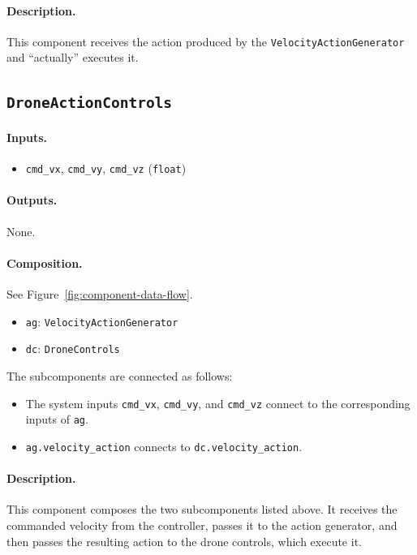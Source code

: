 \documentclass{article}
\begin{document}
\paragraph{Description.} This component receives the action produced by the \texttt{VelocityActionGenerator} and ``actually'' executes it. 

\subsection{\texttt{DroneActionControls}}

\paragraph{Inputs.}
\begin{itemize}
    \item \verb|cmd_vx|, \verb|cmd_vy|, \verb|cmd_vz| (\verb|float|)
\end{itemize}

\paragraph{Outputs.} None.

\paragraph{Composition.}
See Figure~\ref{fig:component-data-flow}.
\begin{itemize}
    \item \verb|ag|: \verb|VelocityActionGenerator|
    \item \verb|dc|: \verb|DroneControls|
\end{itemize}
The subcomponents are connected as follows:
\begin{itemize}
    \item The system inputs \verb|cmd_vx|, \verb|cmd_vy|, and \verb|cmd_vz|
          connect to the corresponding inputs of \verb|ag|.
    \item \verb|ag.velocity_action| connects to \verb|dc.velocity_action|.
\end{itemize}

\paragraph{Description.} This component composes the two subcomponents listed above. It receives the commanded velocity from the controller, passes it to the action generator, and then passes the resulting action to the drone controls, which execute it.
\end{document}
